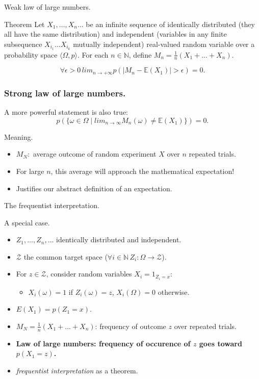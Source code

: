 \documentclass{beamer}
\begin{document}
\begin{frame}{Weak law of large numbers.}
  \begin{block}{Theorem}
    Let $X_1, \dots, X_n \dots$ be an infinite sequence of identically distributed (they all have the same distribution) and independent (variables in any finite subsequence $X_{i_1} \dots X_{i_k}$ mutually independent) real-valued random variable over a probability space $\langle \Omega, p \rangle$. For each $n \in \mathbb{N}$, define $M_n = \frac{1}{n}(X_1 + \dots + X_n)$.

   \[\forall \epsilon > 0\, lim_{n \rightarrow + \infty} p(|M_n - \mathbb{E}(X_1)| > \epsilon ) = 0 .\]
  \end{block}
\end{frame}

\begin{frame}\frametitle{Strong law of large numbers.}
  A more powerful statement is also true:
  \[ p(\{\omega \in \Omega \mid lim_{n \rightarrow \infty} M_n(\omega) \neq \mathbb{E}(X_1) \}) = 0 .\]
\end{frame}

\begin{frame}{Meaning.}
  \begin{itemize}
  \item $M_N: $ average outcome of random experiment $X$ over $n$ repeated trials.
  \item For large $n$, this average will approach the mathematical expectation!
  \item Justifies our abstract definition of an expectation.
  \end{itemize}
\end{frame}

\begin{frame}{The frequentist interpretation.}
  \begin{exampleblock}{A special case.}
    \begin{itemize}
    \item $Z_1, \dots, Z_n, \dots$ identically distributed and independent.
    \item $\mathcal{Z}$ the common target space ($\forall i \in \mathbb{N}\,Z_i : \Omega \rightarrow \mathcal{Z}$).
    \item For $z \in \mathcal{Z}$, consider random variables $X_i = 1_{Z_i = x}$:
      \begin{itemize}
      \item $X_i(\omega) = 1$ if $Z_i(\omega) = z$, $X_i(\Omega) = 0$ otherwise.
      \end{itemize}
    \item $E(X_1) = p(Z_1 = x)$.
    \item $M_N = \frac{1}{n}(X_1 + \dots + X_n)$: frequency of outcome $z$ over repeated trials.
    \item \textbf{Law of large numbers: frequency of occurence of $z$ goes toward $p(X_1 = z)$.}
    \item \emph{frequentist interpretation} as a theorem.
    \end{itemize}
    \end{exampleblock}
\end{frame}
\end{document}

